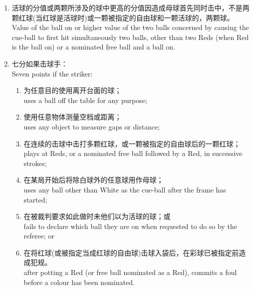 \begin{enumerate}[label=(\alph*),start=1]
\begin{enumerate}[label=(\roman*)]
        contacting a ball in play with the cue-ball, while the cue-ball is in-hand;
        \item 造成一颗处于比赛状态中的球接触任意当前击球轮中或之前击球轮中留在球台附近或台面上的物体或装备；\\
        causing a ball in play to contact any object or equipment left at or on the table during the turn or from previous turns;
        \item 在任意被移除去清洁的球已被摆回台面前击球；或\\
        striking before any balls removed for cleaning have been returned to the table; or
        \item 造成一颗球被迫离台面。\\
        causing a ball to be forced off the table.
    \end{enumerate}
    \item 活球的分值或两颗所涉及的球中更高的分值因造成母球首先同时击中，不是两颗红球(当红球是活球时)或一颗被指定的自由球和一颗活球的，两颗球。\\
    Value of the ball on or higher value of the two balls concerned by causing the cue-ball to first hit simultaneously two balls, other than two Reds (when Red is the ball on) or a nominated free ball and a ball on.
    \item \label{22311d}七分如果击球手：\\
    Seven points if the striker:
    \begin{enumerate}[label=(\roman*)]
        \item 为任意目的使用离开台面的球；\\
        uses a ball off the table for any purpose;
        \item 使用任意物体测量空档或距离；\\
        uses any object to measure gaps or distance;
        \item 在连续的击球中击打多颗红球，或一颗被指定的自由球后的一颗红球；\\
        plays at Reds, or a nominated free ball followed by a Red, in successive strokes;
        \item 在某局开始后将除白球外的任意球用作母球；\\
        uses any ball other than White as the cue-ball after the frame has started;
        \item 在被裁判要求如此做时未\declare{}他们以为活球的球；或\\
        fails to declare which ball they are on when requested to do so by the referee; or
        \item 在将红球(或被指定当成红球的自由球)击球入袋后，在彩球已被指定前造成犯规。\\
        after potting a Red (or free ball nominated as a Red), commits a foul before a colour has been nominated.
    \end{enumerate}
\end{enumerate}
